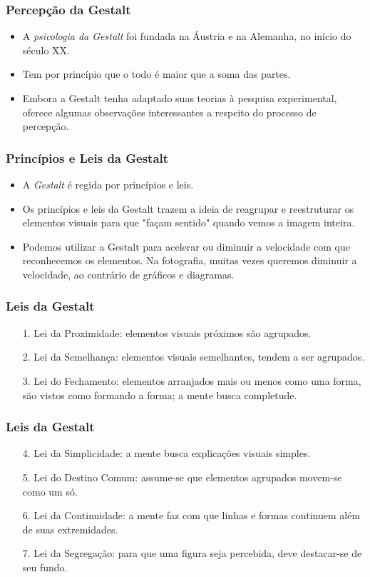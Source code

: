 \begin{frame}
    \frametitle{Percepção da Gestalt}
    \begin{itemize}
      \item A \textit{psicologia da Gestalt} foi fundada na Áustria e na Alemanha,
      no início do século XX.
      \item Tem por princípio que o todo é maior que a soma das partes.
      \item Embora a Gestalt tenha adaptado suas teorias à pesquisa experimental,
      oferece algumas observações interessantes a respeito do processo de percepção.
    \end{itemize}
\end{frame}

\begin{frame}
    \frametitle{Princípios e Leis da Gestalt}
    \begin{itemize}
      \item A \textit{Gestalt} é regida por princípios e leis.
      \item Os princípios e leis da Gestalt trazem a ideia de reagrupar e reestruturar
      os elementos visuais para que "façam sentido" quando vemos a imagem inteira.
      \item Podemos utilizar a Gestalt para acelerar ou diminuir a velocidade com que
      reconhecemos os elementos. Na fotografia, muitas vezes queremos diminuir a
      velocidade, ao contrário de gráficos e diagramas.
    \end{itemize}
\end{frame}

\begin{frame}
    \frametitle{Leis da Gestalt}
    \begin{itemize}
      \item[1.] Lei da Proximidade: elementos visuais próximos são agrupados.
      \item[2.] Lei da Semelhança: elementos visuais semelhantes, tendem a ser agrupados.
      \item[3.] Lei do Fechamento: elementos arranjados mais ou menos como uma forma,
      são vistos como formando a forma; a mente busca completude.
    \end{itemize}
\end{frame}

\begin{frame}
    \frametitle{Leis da Gestalt}
    \begin{itemize}
      \item[4.] Lei da Simplicidade: a mente busca explicações visuais simples.
      \item[5.] Lei do Destino Comum: assume-se que elementos agrupados movem-se como um só.
      \item[6.] Lei da Continuidade: a mente faz com que linhas e formas continuem além de suas extremidades.
      \item[7.] Lei da Segregação: para que uma figura seja percebida, deve destacar-se de seu fundo.
    \end{itemize}
\end{frame}

